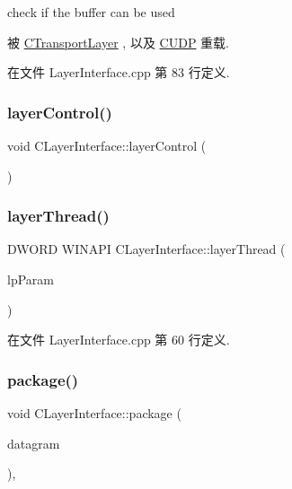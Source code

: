 check if the buffer can be used 

被 \hyperlink{class_c_transport_layer_aace17995c3cff74c756ecdb2a2e8cf43}{C\+Transport\+Layer} , 以及 \hyperlink{class_c_u_d_p_af595428bc531576d9859a9e0b84d03d9}{C\+U\+DP} 重载.



在文件 Layer\+Interface.\+cpp 第 83 行定义.

\mbox{\label{class_c_layer_interface_ad2d30dcc6415c22dd01f87114753d996}} 
\subsubsection{\texorpdfstring{layer\+Control()}{layerControl()}}
{\footnotesize\ttfamily void C\+Layer\+Interface\+::layer\+Control (\begin{DoxyParamCaption}{ }\end{DoxyParamCaption})}

\mbox{\label{class_c_layer_interface_a59d79b4c294ca20c2a761a4f1f737e24}} 
\subsubsection{\texorpdfstring{layer\+Thread()}{layerThread()}}
{\footnotesize\ttfamily D\+W\+O\+RD W\+I\+N\+A\+PI C\+Layer\+Interface\+::layer\+Thread (\begin{DoxyParamCaption}\item[{L\+P\+V\+O\+ID}]{lp\+Param }\end{DoxyParamCaption})\hspace{0.3cm}{\ttfamily [static]}}



在文件 Layer\+Interface.\+cpp 第 60 行定义.

\mbox{\label{class_c_layer_interface_a4bde2a0310c9071cbe7020cc38c97674}} 
\subsubsection{\texorpdfstring{package()}{package()}}
{\footnotesize\ttfamily void C\+Layer\+Interface\+::package (\begin{DoxyParamCaption}\item[{\hyperlink{class_datagram}{Datagram}}]{datagram }\end{DoxyParamCaption})\hspace{0.3cm}{\ttfamily [protected]}, {\ttfamily [virtual]}}



